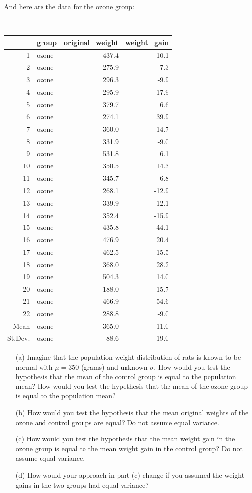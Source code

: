 \begin{question}{}
\noindent And here are the data for the ozone group:

{\footnotesize \tt
\begin{center}
\begin{tabular}{rlrr}
  \toprule
  & group & original\_weight & weight\_gain \\ 
  \midrule
  1 & ozone & 437.4 & 10.1 \\ 
  2 & ozone & 275.9 & 7.3 \\ 
  3 & ozone & 296.3 & -9.9 \\ 
  4 & ozone & 295.9 & 17.9 \\ 
  5 & ozone & 379.7 & 6.6 \\ 
  6 & ozone & 274.1 & 39.9 \\ 
  7 & ozone & 360.0 & -14.7 \\ 
  8 & ozone & 331.9 & -9.0 \\ 
  9 & ozone & 531.8 & 6.1 \\ 
  10 & ozone & 350.5 & 14.3 \\ 
  11 & ozone & 345.7 & 6.8 \\ 
  12 & ozone & 268.1 & -12.9 \\ 
  13 & ozone & 339.9 & 12.1 \\ 
  14 & ozone & 352.4 & -15.9 \\ 
  15 & ozone & 435.8 & 44.1 \\ 
  16 & ozone & 476.9 & 20.4 \\ 
  17 & ozone & 462.5 & 15.5 \\ 
  18 & ozone & 368.0 & 28.2 \\ 
  19 & ozone & 504.3 & 14.0 \\ 
  20 & ozone & 188.0 & 15.7 \\ 
  21 & ozone & 466.9 & 54.6 \\ 
  22 & ozone & 288.8 & -9.0 \\ 
  \midrule
  Mean & ozone & 365.0 & 11.0 \\
  St.Dev. & ozone & 88.6 & 19.0 \\
  \bottomrule
\end{tabular}
\end{center}
}

\begin{enumerate}
\item[(a)] Imagine that the population weight distribution of rats is known to be normal with $\mu = 350$ (grams) and unknown $\sigma$. How would you test the hypothesis that the mean of the control group is equal to the population mean? How would you test the hypothesis that the mean of the ozone group is equal to the population mean?
\item[(b)] How would you test the hypothesis that the mean original weights of the ozone and control groups are equal? Do not assume equal variance. 
\item[(c)] How would you test the hypothesis that the mean weight gain in the ozone group is equal to the mean weight gain in the control group? Do not assume equal variance.
\item[(d)] How would your approach in part (c) change if you assumed the weight gains in the two groups had equal variance?
\end{enumerate}


\end{question}
